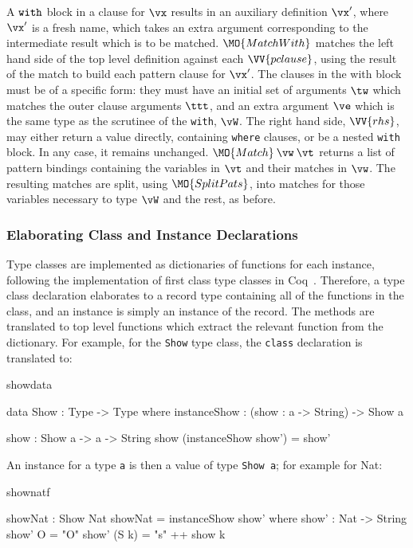 A $\mathtt{with}$ block in a clause for $\vx$
results in an auxiliary definition $\vx'$, where $\vx'$ is a fresh name,
which takes an extra argument corresponding to the intermediate result which
is to be matched.
$\MO{MatchWith}$ matches the left hand side of the top level definition against
each $\VV{pclause}$, using the result of the match to build each pattern clause
for $\vx'$. 
The clauses in the with block must be of a specific form: they must have an initial
set of arguments $\tw$ which matches the outer clause arguments
$\ttt$, and an extra argument
$\ve$ which is the same type as the scrutinee of the \texttt{with}, $\vW$.
The right hand side, $\VV{rhs}$, may either return a value directly, containing 
\texttt{where} clauses, or be a nested \texttt{with} block. In any case, it
remains unchanged.
$\MO{Match}\:\vw\:\vt$ returns a list of pattern bindings containing
the variables in $\vt$ and their matches in $\vw$.
The resulting matches are split, using $\MO{SplitPats}$, into matches for those
variables necessary to type $\vW$ and the rest, as before.

\subsubsection{Elaborating Class and Instance Declarations}

Type classes are implemented as dictionaries of functions for each instance,
following the implementation of first class type classes in Coq~\cite{Sozeau2008}.
Therefore, a type class declaration elaborates to a record type containing all
of the functions in the class, and an instance is simply an instance of the
record. The methods are translated to top level functions which extract the
relevant function from the dictionary.  For example, for the \texttt{Show} type
class, the \texttt{class} declaration is translated to:

\begin{SaveVerbatim}{showdata}

data Show : Type -> Type where
    instanceShow : (show : a -> String) -> Show a

show : Show a -> a -> String
show (instanceShow show') = show'

\end{SaveVerbatim}

\noindent
An instance for a type \texttt{a} is then a value of type \texttt{Show a}; for example for Nat:

\begin{SaveVerbatim}{shownatf}

showNat : Show Nat
showNat = instanceShow show' where
    show' : Nat -> String
    show' O = "O"
    show' (S k) = "s" ++ show k

\end{SaveVerbatim}

